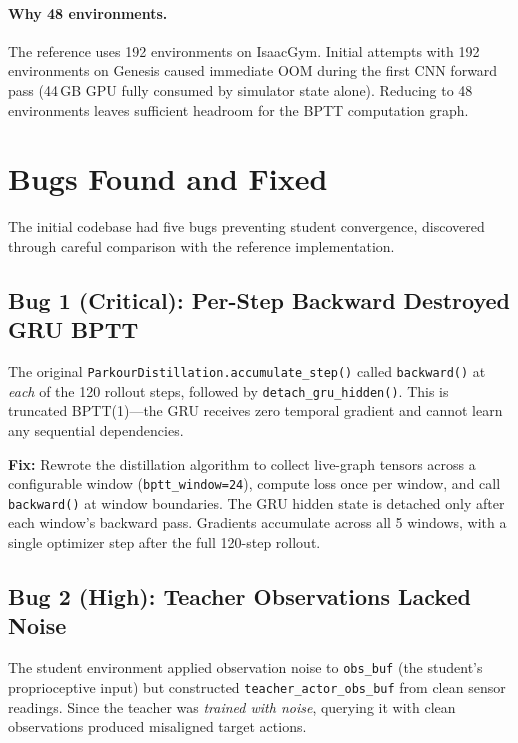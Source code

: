 \documentclass[11pt,a4paper]{article}
\begin{document}
\paragraph{Why 48 environments.}
The reference uses 192 environments on IsaacGym. Initial attempts with 192
environments on Genesis caused immediate OOM during the first CNN forward pass
(44\,GB GPU fully consumed by simulator state alone). Reducing to 48
environments leaves sufficient headroom for the BPTT computation graph.

\section{Bugs Found and Fixed}

The initial codebase had five bugs preventing student convergence, discovered
through careful comparison with the reference implementation.

\subsection{Bug 1 (Critical): Per-Step Backward Destroyed GRU BPTT}

The original \texttt{ParkourDistillation.accumulate\_step()} called
\texttt{backward()} at \emph{each} of the 120 rollout steps, followed by
\texttt{detach\_gru\_hidden()}. This is truncated BPTT(1)---the GRU receives
zero temporal gradient and cannot learn any sequential dependencies.

\textbf{Fix:} Rewrote the distillation algorithm to collect live-graph tensors
across a configurable window (\texttt{bptt\_window=24}), compute loss once per
window, and call \texttt{backward()} at window boundaries. The GRU hidden state
is detached only after each window's backward pass. Gradients accumulate across
all 5 windows, with a single optimizer step after the full 120-step rollout.

\subsection{Bug 2 (High): Teacher Observations Lacked Noise}

The student environment applied observation noise to \texttt{obs\_buf} (the
student's proprioceptive input) but constructed \texttt{teacher\_actor\_obs\_buf}
from clean sensor readings. Since the teacher was \emph{trained with noise},
querying it with clean observations produced misaligned target actions.
\end{document}
